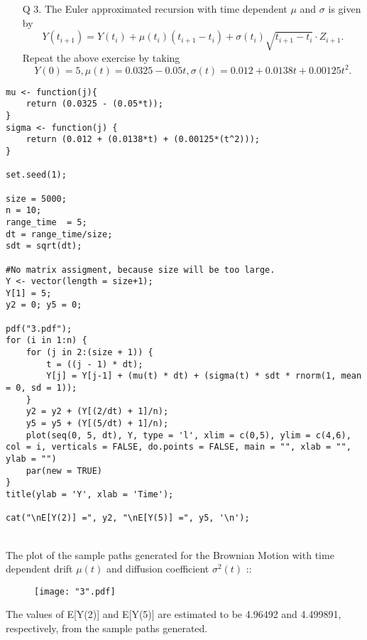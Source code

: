 \documentclass[11pt]{article}
\begin{document}
\begin{enumerate}
\begin{lstlisting}
#No matrix assigment, because size will be too large.
X <- vector(length = size+1);
X[1] = 5;
x2 = 0; x5 = 0;

pdf("2.pdf");
for (i in 1:n) {
	for (j in 2:(size + 1)) {
		X[j] = X[j-1] + (mu * dt) + (sigma * sdt * rnorm(1, mean = 0, sd = 1));
	}
	x2 = x2 + (X[(2/dt) + 1]/n);
	x5 = x5 + (X[(5/dt) + 1]/n);
	plot(seq(0, 5, dt), X, type = 'l', xlim = c(0,5), ylim = c(3,7), col = i, verticals = FALSE, do.points = FALSE, main = "", xlab = "", ylab = "")
	par(new = TRUE)
}
title(ylab = 'X', xlab = 'Time');

cat("\nE[X(2)] =", x2, "\nE[X(5)] =", x5, '\n');
\end{lstlisting}
\newpage
{}\\
The plot of the sample paths generated for the Brownian Motion with drift $\mu$ and diffusion coefficient $\sigma^2$ ::
\begin{figure}[H]
	\centering
	\texttt{[image: "2".pdf]}
\end{figure}

The values of E[X(2)] and E[X(5)] are estimated to be 5.101632 and 5.184239, respectively, from the sample paths generated.
\newpage
\item[Q 3.] The Euler approximated recursion with time dependent $\mu$ and $\sigma$ is given by
$$Y(t_{i+1}) = Y(t_{i}) + \mu(t_{i})(t_{i+1} - t_{i}) + \sigma(t_{i})\sqrt{t_{i+1} - t_{i}} \cdot Z_{i+1}.$$
Repeat the above exercise by taking
$$Y(0) = 5, \mu(t) = 0.0325 - 0.05t, \sigma(t) = 0.012 + 0.0138t + 0.00125t^{2}.$$
\end{enumerate}
\begin{lstlisting}
mu <- function(j){
	return (0.0325 - (0.05*t));
}
sigma <- function(j) { 
	return (0.012 + (0.0138*t) + (0.00125*(t^2)));
}

set.seed(1);

size = 5000;
n = 10;
range_time  = 5;
dt = range_time/size;
sdt = sqrt(dt);

#No matrix assigment, because size will be too large.
Y <- vector(length = size+1);
Y[1] = 5;
y2 = 0; y5 = 0;

pdf("3.pdf");
for (i in 1:n) {
	for (j in 2:(size + 1)) {
		t = ((j - 1) * dt);
		Y[j] = Y[j-1] + (mu(t) * dt) + (sigma(t) * sdt * rnorm(1, mean = 0, sd = 1));
	}
	y2 = y2 + (Y[(2/dt) + 1]/n);
	y5 = y5 + (Y[(5/dt) + 1]/n);
	plot(seq(0, 5, dt), Y, type = 'l', xlim = c(0,5), ylim = c(4,6), col = i, verticals = FALSE, do.points = FALSE, main = "", xlab = "", ylab = "")
	par(new = TRUE)
}
title(ylab = 'Y', xlab = 'Time');

cat("\nE[Y(2)] =", y2, "\nE[Y(5)] =", y5, '\n');
\end{lstlisting}
\newpage
{}\\
The plot of the sample paths generated for the Brownian Motion with time dependent drift $\mu(t)$ and diffusion coefficient $\sigma^{2}(t)$ ::
\begin{figure}[H]
	\centering
	\texttt{[image: "3".pdf]}
\end{figure}

The values of E[Y(2)] and E[Y(5)] are estimated to be 4.96492 and 4.499891, respectively, from the sample paths generated.
\end{document}
